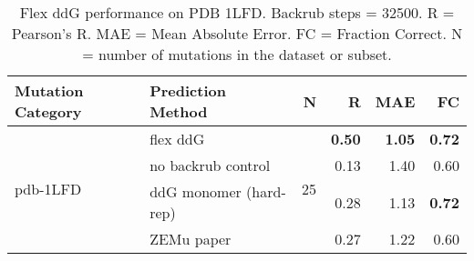 \begin{table}
  \begin{tabular}{llrrrr}
\toprule
Mutation Category &       Prediction Method &   N &    R &  MAE &   FC \\
\midrule
 \multirow{ 4}{*}{pdb-1LFD} & flex ddG & \multirow{ 4}{*}{25} & \textbf{0.50} & \textbf{1.05} & \textbf{0.72}  \\
 & no backrub control & & 0.13 & 1.40 & 0.60  \\
 & ddG monomer (hard-rep) & & 0.28 & 1.13 & \textbf{0.72}  \\
 & ZEMu paper & & 0.27 & 1.22 & 0.60  \\
\bottomrule
\end{tabular}
  \caption[Flex ddG performance on PDB 1LFD]{
    Flex ddG performance on PDB 1LFD. Backrub steps = 32500. R = Pearson's R. MAE = Mean Absolute Error. FC = Fraction Correct. N = number of mutations in the dataset or subset.
  } \label{tab:table-pdb-1LFD}
\end{table}
